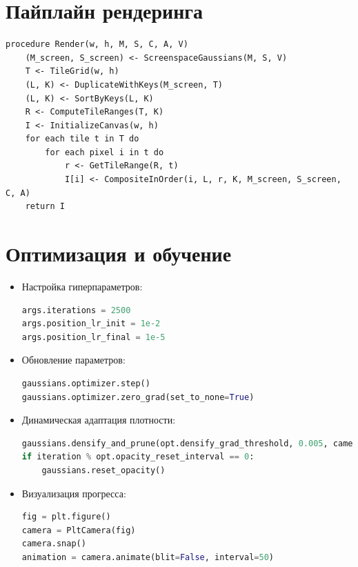 \section{Пайплайн рендеринга}

\begin{lstlisting}[style=pseudocode,caption={Rendering Pipeline for 3D Gaussians}]
procedure Render(w, h, M, S, C, A, V)
    (M_screen, S_screen) <- ScreenspaceGaussians(M, S, V)
    T <- TileGrid(w, h)
    (L, K) <- DuplicateWithKeys(M_screen, T)
    (L, K) <- SortByKeys(L, K)
    R <- ComputeTileRanges(T, K)
    I <- InitializeCanvas(w, h)
    for each tile t in T do
        for each pixel i in t do
            r <- GetTileRange(R, t)
            I[i] <- CompositeInOrder(i, L, r, K, M_screen, S_screen, C, A)
    return I
\end{lstlisting}


\section{Оптимизация и обучение}

\begin{itemize}
    \item Настройка гиперпараметров:
    \begin{lstlisting}[language=Python]
args.iterations = 2500
args.position_lr_init = 1e-2
args.position_lr_final = 1e-5
    \end{lstlisting}

    \item Обновление параметров:
    \begin{lstlisting}[language=Python]
gaussians.optimizer.step()
gaussians.optimizer.zero_grad(set_to_none=True)
    \end{lstlisting}

    \item Динамическая адаптация плотности:
    \begin{lstlisting}[language=Python]
gaussians.densify_and_prune(opt.densify_grad_threshold, 0.005, camera_extent, size_threshold)
if iteration % opt.opacity_reset_interval == 0:
    gaussians.reset_opacity()
    \end{lstlisting}

    \item Визуализация прогресса:
    \begin{lstlisting}[language=Python]
fig = plt.figure()
camera = PltCamera(fig)
camera.snap()
animation = camera.animate(blit=False, interval=50)
    \end{lstlisting}
\end{itemize}

